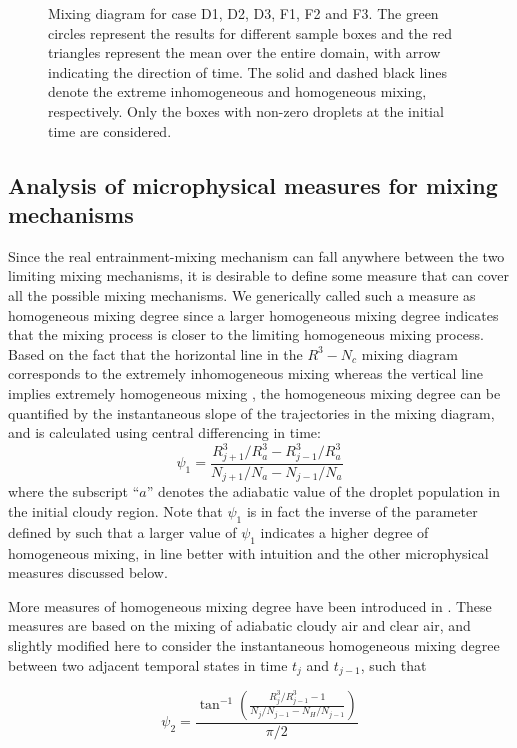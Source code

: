 \documentclass[draft,jgrga]{AGUTeX}
\begin{document}
\begin{article}
\begin{figure}[!htbp]
\caption{Mixing diagram for case D1, D2, D3, F1, F2 and F3. The green
circles represent the results for different sample boxes and the red triangles represent the mean over the entire domain, with arrow indicating the direction of time. The solid and dashed black lines denote the extreme inhomogeneous and homogeneous mixing, respectively. Only the boxes with non-zero droplets at the initial time are considered.}
\label{fig:mixing_diagram}
\end{figure}

\subsection{Analysis of microphysical measures for mixing mechanisms}
Since the real entrainment-mixing mechanism can fall anywhere between the two limiting mixing mechanisms, it is desirable to define some measure that can cover all the possible mixing mechanisms. We generically called such a measure as homogeneous mixing degree since a larger homogeneous mixing degree indicates that the mixing process is closer to the limiting homogeneous mixing process. Based on the fact that the horizontal line in the $R^3−N_c$ mixing diagram corresponds to the extremely inhomogeneous mixing whereas the vertical line implies extremely homogeneous mixing \citep{And09}, the homogeneous mixing degree can be quantified by the instantaneous slope of the trajectories in the mixing diagram, and is calculated using central differencing in time: 
\begin{equation}
\psi_1 = \frac{R_{j+1}^3/R_a^3 - R_{j-1}^3/R_a^3}{N_{j+1}/N_a - N_{j-1}/N_a}
\label{phi1}
\end{equation}
where the subscript ``$a$'' denotes the adiabatic value of the droplet population in the initial cloudy region. Note that $\psi_1$ is in fact the inverse of the parameter defined by \citep{And09} such that a larger value of $\psi_1$ indicates a higher degree of homogeneous mixing, in line better with intuition and the other microphysical measures discussed below.

More measures of homogeneous mixing degree have been introduced in \cite{Lu2013, Lu2014}.
These measures are based on the mixing of adiabatic cloudy air and clear air, and slightly 
modified here to consider the instantaneous homogeneous mixing degree between two adjacent 
temporal states in time $t_j$ and $t_{j-1}$, such that
  
\begin{equation}
\psi_2 = \frac{\tan^{-1}(\frac{R_{j}^3/R_{j-1}^3 - 1}{N_j/N_{j-1} - N_H/N_{j-1}})}{\pi/2}
\label{phi2}
\end{equation}


\end{article}
\end{document}
